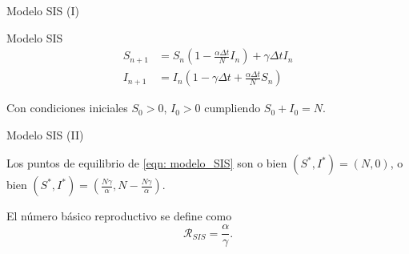 \begin{frame}{Modelo SIS (I)}
    \begin{block}{Modelo SIS \cite{allenDiscretetimeSISIR1994}}
        \begin{equation}
            \label{eqn: modelo_SIS}
            \begin{aligned}
            S_{n+1} & = S_n \left(1-\frac{\alpha\Delta t}{N} I_n \right) + \gamma \Delta t I_n \\
            I_{n+1} & = I_n \left( 1-\gamma \Delta t + \frac{\alpha\Delta t}{N} S_n \right)
            \end{aligned}
            \end{equation}
            
            Con condiciones iniciales $S_0>0$, $I_0>0$ cumpliendo $S_0+I_0=N$.
    \end{block}

    \begin{center}
        \end{center}

\end{frame}


\begin{frame}{Modelo SIS (II)}

    \begin{lema}
        Los puntos de equilibrio de \eqref{eqn: modelo_SIS} son o bien $(S^*,I^*)=(N,0)$, o bien $(S^*,I^*)=(\frac{N\gamma}{\alpha}, N-\frac{N\gamma}{\alpha})$.
    \end{lema}

    \pause

    \begin{definicion}
        El número básico reproductivo se define como 
        $$\mathcal{R}_{SIS}=\frac{\alpha}{\gamma}.$$
    \end{definicion}
\end{frame}


